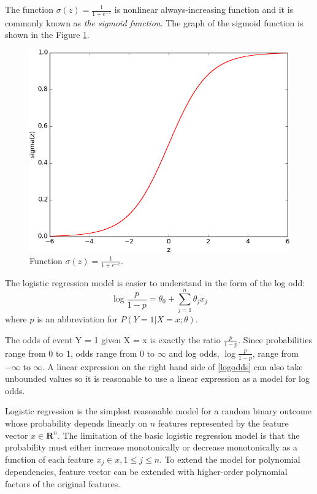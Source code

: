 \documentclass[times, utf8, zavrsni]{fer}
\begin{document}
The function $\sigma(z) = \frac{1}{1 + e ^ {-z}}$ is nonlinear always-increasing function  and it is commonly known as \emph{the sigmoid function}. The graph of the sigmoid function is shown in the Figure \ref{sig}.
\begin{figure}[htp]
\centering
\includegraphics[scale=0.59]{sig.png}
\caption{Function $\sigma(z) = \frac{1}{1 + e ^ {-z}}$.}
\label{sig}
\end{figure}

The logistic  regression model is easier to understand in the form of the log odd:
\begin{equation}
\log \frac{p}{1 - p} = \theta_0 + \sum_{j = 1}^n \theta_j x_j
\label{logodds}
\end{equation}
where $p$ is an abbreviation for $P(Y = 1 | X =x; \theta)$.

The odds of event Y = 1 given  X = x is exactly the ratio $\frac{p}{1 - p}$.  Since probabilities range from $0$ to $1$, odds range from $0$ to $\infty$ and log odds, $\log\frac{p}{1 - p}$, range from $-\infty$ to $\infty$. A linear expression on the right hand side of \eqref{logodds} can also take unbounded values so it is reasonable to use  a linear  expression as a model for log odds.

Logistic regression is the simplest reasonable model for a random binary outcome whose probability depends linearly on $n$ features represented by the feature vector $x \in \mathbf{R}^n$.  The limitation of the basic logistic regression model is that the probability must either increase monotonically or decrease monotonically as a function of each feature $x_j \in x, 1 \leq j \leq n$. To extend the model for polynomial dependencies, feature vector can be extended with higher-order polynomial factors of the original features. 
\end{document}
